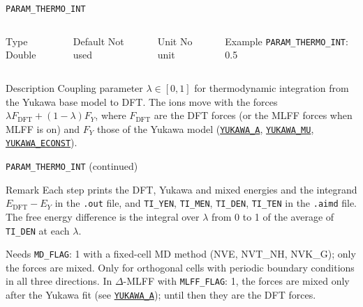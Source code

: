 \begin{frame}[allowframebreaks]{\texttt{{PARAM\_THERMO\_INT}}} \label{PARAM_THERMO_INT}
\vspace*{-12pt}
\begin{columns}
\begin{block}{Type}
Double
\end{block}

\begin{block}{Default}
Not used
\end{block}

\begin{block}{Unit}
No unit
\end{block}

\begin{block}{Example}
\texttt{PARAM\_THERMO\_INT}: 0.5
\end{block}
\end{columns}

\begin{block}{Description}
Coupling parameter $\lambda \in [0, 1]$ for thermodynamic integration from the Yukawa base model to DFT. The ions move with the forces $\lambda F_{\text{DFT}} + (1-\lambda) F_Y$, where $F_{\text{DFT}}$ are the DFT forces (or the MLFF forces when MLFF is on) and $F_Y$ those of the Yukawa model (\hyperlink{YUKAWA_A}{\texttt{YUKAWA\_A}}, \hyperlink{YUKAWA_MU}{\texttt{YUKAWA\_MU}}, \hyperlink{YUKAWA_ECONST}{\texttt{YUKAWA\_ECONST}}).
\end{block}

\end{frame}

\begin{frame}[allowframebreaks]{\texttt{{PARAM\_THERMO\_INT}} (continued)}
\begin{block}{Remark}
Each step prints the DFT, Yukawa and mixed energies and the integrand $E_{\text{DFT}} - E_Y$ in the \texttt{.out} file, and \texttt{TI\_YEN}, \texttt{TI\_MEN}, \texttt{TI\_DEN}, \texttt{TI\_TEN} in the \texttt{.aimd} file. The free energy difference is the integral over $\lambda$ from 0 to 1 of the average of \texttt{TI\_DEN} at each $\lambda$.

Needs \texttt{MD\_FLAG}: 1 with a fixed-cell MD method (NVE, NVT\_NH, NVK\_G); only the forces are mixed. Only for orthogonal cells with periodic boundary conditions in all three directions. In $\Delta$-MLFF with \texttt{MLFF\_FLAG}: 1, the forces are mixed only after the Yukawa fit (see \hyperlink{YUKAWA_A}{\texttt{YUKAWA\_A}}); until then they are the DFT forces.
\end{block}

\end{frame}
